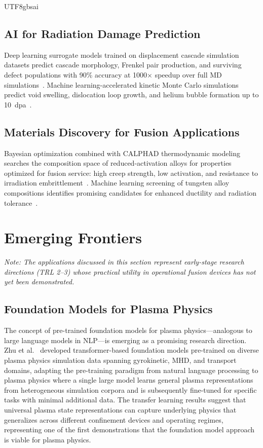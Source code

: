 \documentclass[12pt,a4paper]{article}
\begin{document}
\begin{CJK}{UTF8}{gbsai}
\subsection{AI for Radiation Damage Prediction}

Deep learning surrogate models trained on displacement cascade simulation datasets predict cascade morphology, Frenkel pair production, and surviving defect populations with 90\% accuracy at 1000$\times$ speedup over full MD simulations~\citep{Kilymis2024}. Machine learning-accelerated kinetic Monte Carlo simulations predict void swelling, dislocation loop growth, and helium bubble formation up to 10~dpa~\citep{Becquart2024}.

\subsection{Materials Discovery for Fusion Applications}

Bayesian optimization combined with CALPHAD thermodynamic modeling searches the composition space of reduced-activation alloys for properties optimized for fusion service: high creep strength, low activation, and resistance to irradiation embrittlement~\citep{Garrison2024}. Machine learning screening of tungsten alloy compositions identifies promising candidates for enhanced ductility and radiation tolerance~\citep{Hu2024}.

\section{Emerging Frontiers}

\textit{Note: The applications discussed in this section represent early-stage research directions (TRL 2--3) whose practical utility in operational fusion devices has not yet been demonstrated.}

\subsection{Foundation Models for Plasma Physics}

The concept of pre-trained foundation models for plasma physics---analogous to large language models in NLP---is emerging as a promising research direction. Zhu et al.~\citep{Zhu2025} developed transformer-based foundation models pre-trained on diverse plasma physics simulation data spanning gyrokinetic, MHD, and transport domains, adapting the pre-training paradigm from natural language processing to plasma physics where a single large model learns general plasma representations from heterogeneous simulation corpora and is subsequently fine-tuned for specific tasks with minimal additional data. The transfer learning results suggest that universal plasma state representations can capture underlying physics that generalizes across different confinement devices and operating regimes, representing one of the first demonstrations that the foundation model approach is viable for plasma physics.


\end{CJK}
\end{document}
